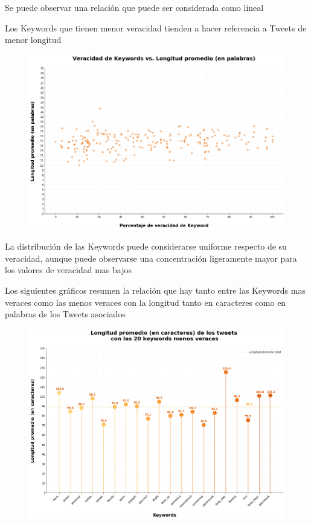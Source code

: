 \documentclass[titlepage,a4paper]{article}
\begin{document}
    Se puede observar una relación que puede ser considerada como lineal
    
    Los Keywords que tienen menor veracidad tienden a hacer referencia a Tweets de menor longitud
    
    \begin{figure}[H]
    \centering
    \includegraphics[width=1\textwidth]{graficos/Analisis de Keyword/veracidad_de_keywords_vs_long_promedio_en_palabras.png}
    \caption{} 
    \end{figure}
    
    La distribución de las Keywords puede considerarse uniforme respecto de su veracidad, aunque puede observarse una concentración ligeramente mayor para los valores de veracidad mas bajos
    
    \newpage
    
    Los siguientes gráficos resumen la relación que hay tanto entre las Keywords mas veraces como las menos veraces con la longitud tanto en caracteres como en palabras de los Tweets asociados
    
    \begin{figure}[H]
    \centering
    \includegraphics[width=1\textwidth]{graficos/Analisis de Keyword/long_prom_char_keywords_no_veraces.png}
    \caption{} 
    \end{figure}
    
\end{document}
